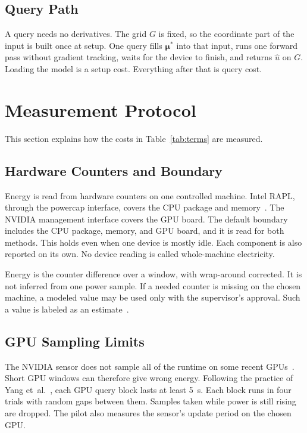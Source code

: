 \documentclass[journal]{IEEEtran}
\begin{document}
\subsection{Query Path}
A query needs no derivatives. The grid $G$ is fixed, so the coordinate part of the input is built once at setup. One query fills $\boldsymbol{\mu}^\ast$ into that input, runs one forward pass without gradient tracking, waits for the device to finish, and returns $\hat u$ on $G$. Loading the model is a setup cost. Everything after that is query cost.

\section{Measurement Protocol}\label{sec:measure}

This section explains how the costs in Table~\ref{tab:terms} are measured.

\subsection{Hardware Counters and Boundary}
Energy is read from hardware counters on one controlled machine. Intel RAPL, through the powercap interface, covers the CPU package and memory~\cite{henderson2020,khan2018}. The NVIDIA management interface covers the GPU board. The default boundary includes the CPU package, memory, and GPU board, and it is read for both methods. This holds even when one device is mostly idle. Each component is also reported on its own. No device reading is called whole-machine electricity.

Energy is the counter difference over a window, with wrap-around corrected. It is not inferred from one power sample. If a needed counter is missing on the chosen machine, a modeled value may be used only with the supervisor's approval. Such a value is labeled as an estimate~\cite{lacoste2019,jay2023,bouza2023}.

\subsection{GPU Sampling Limits}
The NVIDIA sensor does not sample all of the runtime on some recent GPUs~\cite{yang2024}. Short GPU windows can therefore give wrong energy. Following the practice of Yang et~al.~\cite{yang2024}, each GPU query block lasts at least 5~s. Each block runs in four trials with random gaps between them. Samples taken while power is still rising are dropped. The pilot also measures the sensor's update period on the chosen GPU.
\end{document}
